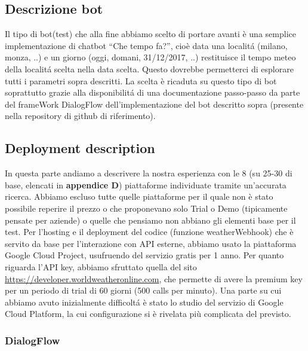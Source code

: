 \documentclass[]{article}
\begin{document}
\subsection{Descrizione bot}
Il tipo di bot(test) che alla fine abbiamo scelto di portare avanti è una semplice implementazione di chatbot “Che tempo fa?”, cioè data una localitá (milano, monza, ..) e un giorno (oggi, domani, 31/12/2017, ..) restituisce il tempo meteo della localitá scelta nella data scelta. Questo dovrebbe permetterci di esplorare tutti i parametri sopra descritti.
La scelta è ricaduta su questo tipo di bot soprattutto grazie alla disponibilitá di una documentazione passo-passo da parte del frameWork DialogFlow dell'implementazione del bot descritto sopra (presente nella repository di github di riferimento).

\subsection{Deployment description}
In questa parte andiamo a descrivere la nostra esperienza con le 8 (su 25-30 di base, elencati in \textbf{appendice D}) piattaforme individuate tramite un'accurata ricerca. Abbiamo escluso tutte quelle piattaforme per il quale non è stato possibile reperire il prezzo o che proponevano solo Trial o Demo (tipicamente pensate per aziende) o quelle che pensiamo non abbiano gli elementi base per il test.
Per l’hosting e il deployment del codice (funzione weatherWebhook) che è servito da base per l’interazione con API esterne, abbiamo usato la piattaforma Google Cloud Project, usufruendo del servizio gratis per 1 anno. Per quanto riguarda l’API key, abbiamo sfruttato quella del sito \url{https://developer.worldweatheronline.com}, che permette di avere la premium key per un periodo di trial di 60 giorni (500 calls per minuto). Una parte su cui abbiamo avuto inizialmente difficoltá è stato lo studio del servizio di Google Cloud Platform, la cui configurazione si è rivelata più complicata del previsto.
\subsubsection{DialogFlow} 
\end{document}
